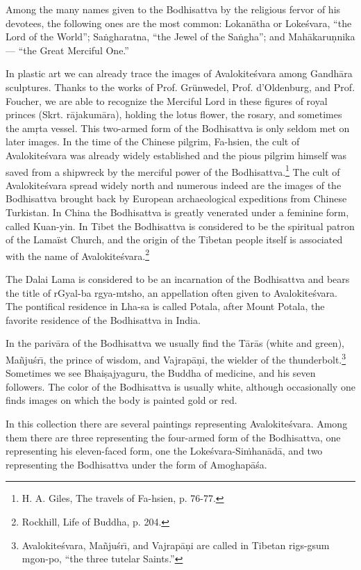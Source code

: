\documentclass[a4paper, 12pt, oneside]{article}
\begin{document}
Among the many names given to the Bodhisattva by the religious fervor of his devotees, the following ones are the most common: Lokan\={a}tha or Loke\'{s}vara, ``the Lord of the World''; Sa\.{n}gharatna, ``the Jewel of the Sa\.{n}gha''; and Mah\={a}karu\d{n}nika --- ``the Great Merciful One.''

In plastic art we can already trace the images of Avalokite\'{s}vara among Gandh\={a}ra sculptures. Thanks to the works of Prof. Grünwedel, Prof. d'Oldenburg, and Prof. Foucher, we are able to recognize the Merciful Lord in these figures of royal princes (Skrt. r\={a}jakum\={a}ra), holding the lotus flower, the rosary, and sometimes the am\d{r}ta vessel. This two-armed form of the Bodhisattva is only seldom met on later images. In the time of the Chinese pilgrim, Fa-hsien, the cult of Avalokite\'{s}vara was already widely established and the pious pilgrim himself was saved from a shipwreck by the merciful power of the Bodhisattva.\footnote{H. A. Giles, The travels of Fa-hsien, p. 76-77.} The cult of Avalokite\'{s}vara spread widely north and numerous indeed are the images of the Bodhisattva brought back by European archaeological expeditions from Chinese Turkistan. In China the Bodhisattva is greatly venerated under a feminine form, called Kuan-yin. In Tibet the Bodhisattva is considered to be the spiritual patron of the Lamaïst Church, and the origin of the Tibetan people itself is associated with the name of Avalokite\'{s}vara.\footnote{Rockhill, Life of Buddha, p. 204.}

The Dalai Lama is considered to be an incarnation of the Bodhisattva and bears the title of rGyal-ba rgya-mtsho, an appellation often given to Avalokite\'{s}vara. The pontifical residence in Lha-sa is called Potala, after Mount Potala, the favorite residence of the Bodhisattva in India.

In the pariv\={a}ra of the Bodhisattva we usually find the T\={a}r\={a}s (white and green), Ma\~{n}ju\'{s}r\={\i}, the prince of wisdom, and Vajrap\={a}\d{n}i, the wielder of the thunderbolt.\footnote{Avalokite\'{s}vara, Ma\~{n}ju\'{s}r\={\i}, and Vajrap\={a}\d{n}i are called in Tibetan rigs-gsum mgon-po, ``the three tutelar Saints.''} Sometimes we see Bhai\d{s}ajyaguru, the Buddha of medicine, and his seven followers. The color of the Bodhisattva is usually white, although occasionally one finds images on which the body is painted gold or red.

In this collection there are several paintings representing Avalokite\'{s}vara. Among them there are three representing the four-armed form of the Bodhisattva, one representing his eleven-faced form, one the Loke\'{s}vara-Si\.{m}han\={a}d\={a}, and two representing the Bodhisattva under the form of Amoghap\={a}\'{s}a.
\end{document}
